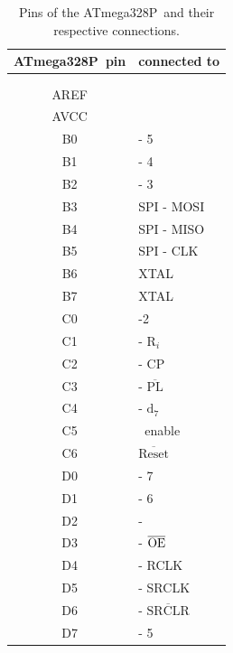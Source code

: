 \documentclass[english, parskip=half-, 11pt]{scrartcl}
\newcommand{\invertPin}[1]{$\overline{\text{#1}}$}
\newcommand{\ground}{\text{GND}}
\newcommand{\vcc}{\text{VCC}}
\newcommand{\vccPeriphery}{\text{VCCo}}
\newcommand{\serialIn}{\text{SER}}
\newcommand{\outputEnable}{\text{OE}}
\newcommand{\mosi}{MOSI}
\newcommand{\miso}{MISO}
\newcommand{\reset}{Reset}
\newcommand{\clock}{CLK}
\newcommand{\spi}{SPI}
\newcommand{\atmegathreetwoeightp}{ATmega328P}
\newcommand{\avcc}{AVCC}
\newcommand{\aref}{AREF}
\newcommand{\xtal}{XTAL}
\newcommand{\shiftRegisterName}{\text{74HC595}}
\newcommand{\shiftRegisterClockOut}{RCLK}
\newcommand{\shiftRegisterClockIn}{SRCLK}
\newcommand{\shiftRegisterClear}{SRCLR}
\newcommand{\parallelLoadName}{\text{74HC165}}
\newcommand{\parallelLoadParallelLoad}{PL}
\newcommand{\parallelLoadClock}{CP}
\newcommand{\parallelLoadInternalBit}{\text{d}}
\newcommand{\latchName}{\text{CD4043B}}
\newcommand{\latchReset}{\text{R}}
\newcommand{\additionalPinsOneName}{\text{connectorLeft}}
\newcommand{\additionalPinsTwoName}{\text{connectorRight}}
\newcommand{\devicePinConcatenation}[2]{{#1} - {#2}}
\begin{document}
\begin{table}[H]
	\centering
	\caption{Pins of the \atmegathreetwoeightp\ and their respective connections.}
	\label{tab:atmega328pConnections}
	\begin{tabular}{c|l}
		\atmegathreetwoeightp\ pin  & connected to \\\hline
		\vcc & \vcc\\
		\ground & \ground\\
		\aref & \vcc\\
		\avcc & \vcc\\
		B0 & \devicePinConcatenation{\additionalPinsOneName}{5}\\
		B1 & \devicePinConcatenation{\additionalPinsTwoName}{4}\\
		B2 & \devicePinConcatenation{\additionalPinsTwoName}{3}\\
		B3 & \devicePinConcatenation{\spi}{\mosi}\\
		B4 & \devicePinConcatenation{\spi}{\miso}\\
		B5 & \devicePinConcatenation{\spi}{\clock}\\
		B6 & \xtal\\
		B7 & \xtal\\
		C0 & \additionalPinsTwoName-2\\
		C1 & \devicePinConcatenation{\latchName}{$\latchReset_i$}\\
		C2 & \devicePinConcatenation{\parallelLoadName}{\parallelLoadClock}\\
		C3 & \devicePinConcatenation{\parallelLoadName}{\invertPin{\parallelLoadParallelLoad}}\\
		C4 & \devicePinConcatenation{\parallelLoadName}{$\parallelLoadInternalBit_{7}$}\\
		C5 & \vccPeriphery\ enable\\
		C6 & \invertPin{\reset}\\
		D0 & \devicePinConcatenation{\additionalPinsOneName}{7}\\
		D1 & \devicePinConcatenation{\additionalPinsOneName}{6}\\
		D2 & \devicePinConcatenation{\shiftRegisterName}{\serialIn}\\
		D3 & \devicePinConcatenation{\shiftRegisterName}{\invertPin{\outputEnable}}\\
		D4 & \devicePinConcatenation{\shiftRegisterName}{\shiftRegisterClockOut}\\
		D5 & \devicePinConcatenation{\shiftRegisterName}{\shiftRegisterClockIn}\\
		D6 & \devicePinConcatenation{\shiftRegisterName}{\invertPin{\shiftRegisterClear}}\\
		D7 & \devicePinConcatenation{\additionalPinsTwoName}{5}\\
	\end{tabular}
\end{table}
\end{document}
